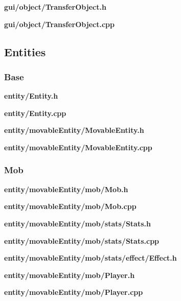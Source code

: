 \documentclass[../Main.tex]{subfiles}
\begin{document}
            \textbf{gui/object/TransferObject.h}
            
            \textbf{gui/object/TransferObject.cpp}
            

    \subsection{Entities}
        \subsubsection{Base}
            \textbf{entity/Entity.h}
            
            \textbf{entity/Entity.cpp}
            

            \textbf{entity/movableEntity/MovableEntity.h}
            
            \textbf{entity/movableEntity/MovableEntity.cpp}
            

        \subsubsection{Mob}
            \textbf{entity/movableEntity/mob/Mob.h}
            
            \textbf{entity/movableEntity/mob/Mob.cpp}
            

            \textbf{entity/movableEntity/mob/stats/Stats.h}
            
            \textbf{entity/movableEntity/mob/stats/Stats.cpp}
            

            \textbf{entity/movableEntity/mob/stats/effect/Effect.h}
            

            \textbf{entity/movableEntity/mob/Player.h}
            
            \textbf{entity/movableEntity/mob/Player.cpp}
            
\end{document}
